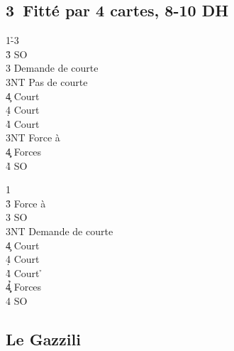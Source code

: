 \documentclass[a4paper]{article}
\begin{document}
\subsection{3\pdfd\ Fitté par 4 cartes, 8-10 DH}

\begin{bidtable}
1\h-3\d\\
3\h \> SO\\
3\s \> Demande de courte\+\\
3NT \> Pas de courte\+\\
4\c \> Court \c \\
4\d \> Court \d \\
4\h \> Court \s \-\-\\
3NT \> Force à \s \\
4\c\d \> Forces\\
4\h \> SO
\end{bidtable}

\begin{bidtable}
1\d\\
3\h \> Force à \h \\
3\s \> SO\\
3NT \> Demande de courte\+\\
4\c \> Court \c \\
4\d \> Court \d \\
4\h \> Court \h \-\\
4\c\d\h \> Forces\\
4\s \> SO
\end{bidtable}

\subsection{Le Gazzili}
\end{document}
